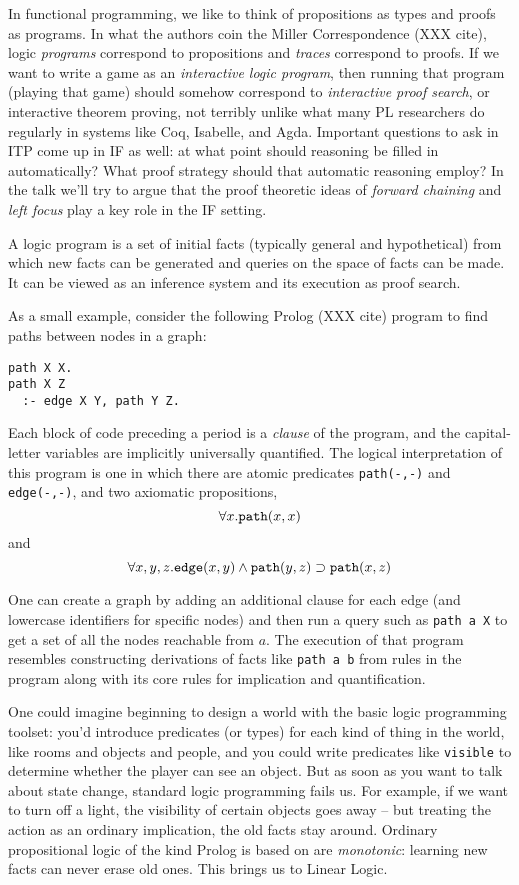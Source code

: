 \renewcommand{\implies}{\supset}

In functional programming, we like to think of propositions as
types and proofs as programs. In what the authors coin the Miller
Correspondence (XXX cite), logic {\em programs} correspond to propositions
and {\em traces} correspond to proofs. If we want to write a game as an
{\em interactive logic program}, then running that program (playing that
game) should somehow correspond to {\em interactive proof search}, or
interactive theorem proving, not terribly unlike what many PL researchers
do regularly in systems like Coq, Isabelle, and Agda. Important questions
to ask in ITP come up in IF as well: at what point should reasoning be
filled in automatically? What proof strategy should that automatic
reasoning employ? In the talk we'll try to argue that the proof theoretic
ideas of {\em forward chaining} and {\em left focus} play a key role in the
IF setting.

A logic program is a set of initial facts (typically general and
hypothetical) from which new facts can be generated and queries on the
space of facts can be made. It can be viewed as an inference system and its
execution as proof search.

As a small example, consider the following Prolog (XXX cite) program to
find paths between nodes in a graph:

\begin{verbatim}
path X X.
path X Z
  :- edge X Y, path Y Z.
\end{verbatim}

Each block of code preceding a period is a {\em clause} of the program, and
the capital-letter variables are implicitly universally quantified.
The logical interpretation of this program is one in which there are atomic
predicates \verb|path(-,-)| and \verb|edge(-,-)|, and two axiomatic
propositions, 
\[\forall x.\verb|path|(x, x)\] 
and 
\[\forall x,y,z.\verb|edge|(x, y) \land \verb|path|(y, z) \implies 
\verb|path|(x, z)\]

One can create a graph by adding an additional clause for each edge (and
lowercase identifiers for specific nodes) and then run a query such as
\verb|path a X| to get a set of all the nodes reachable from $a$. The
execution of that program resembles constructing derivations of facts like
\verb|path a b| from rules in the program along with its core rules for
implication and quantification.

One could imagine beginning to design a world with the basic logic
programming toolset: you'd introduce predicates (or types) for each kind of
thing in the world, like rooms and objects and people, and you could write
predicates like \verb|visible| to determine whether the player can see an
object. But as soon as you want to talk about state change, standard logic
programming fails us. For example, if we want to turn off a light, the
visibility of certain objects goes away -- but treating the action as an
ordinary implication, the old facts stay around. Ordinary propositional
logic of the kind Prolog is based on are {\em monotonic}: learning new
facts can never erase old ones. This brings us to Linear Logic.


